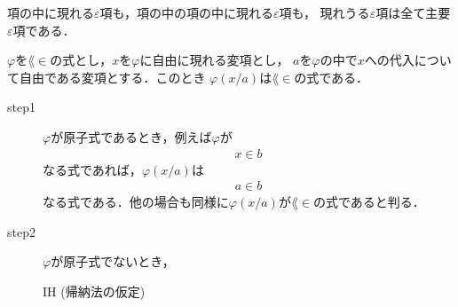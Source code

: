 	項の中に現れる$\varepsilon$項も，項の中の項の中に現れる$\varepsilon$項も，
	現れうる$\varepsilon$項は全て主要$\varepsilon$項である．
	
	\begin{screen}
		\begin{metathm}[代入後も式]
			$\varphi$を$\lang{\in}$の式とし，$x$を$\varphi$に自由に現れる変項とし，
			$a$を$\varphi$の中で$x$への代入について自由である変項とする．このとき
			$\varphi(x/a)$は$\lang{\in}$の式である．
		\end{metathm}
	\end{screen}
	
	\begin{metaprf}\mbox{}
		\begin{description}
			\item[step1] $\varphi$が原子式であるとき，例えば$\varphi$が
				\begin{align}
					x \in b
				\end{align}
				なる式であれば，$\varphi(x/a)$は
				\begin{align}
					a \in b
				\end{align}
				なる式である．他の場合も同様に$\varphi(x/a)$が$\lang{\in}$の式であると判る．
			
			\item[step2] $\varphi$が原子式でないとき，
				\begin{itembox}[l]{IH (帰納法の仮定)}
				\end{itembox}
		\end{description}
	\end{metaprf}